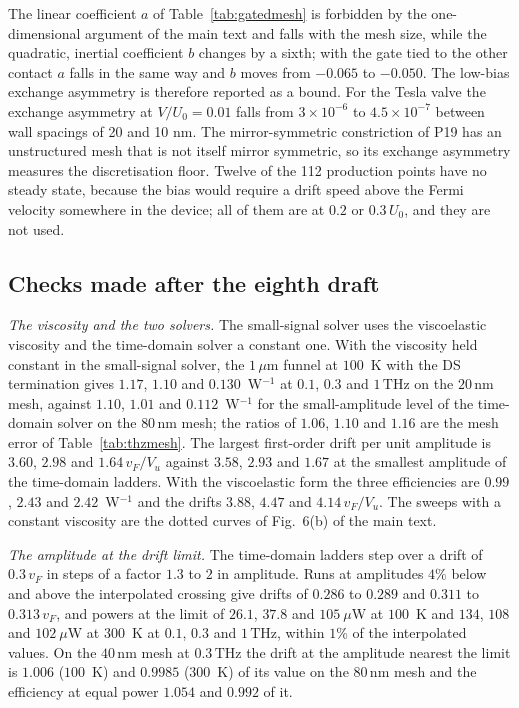\documentclass[aps,prapplied,onecolumn,superscriptaddress,floatfix]{revtex4-2}
\newcommand{\um}{\,\mu\mathrm{m}}
\newcommand{\nm}{\,\mathrm{nm}}
\newcommand{\THz}{\,\mathrm{THz}}
\begin{document}
The linear coefficient $a$ of Table~\ref{tab:gatedmesh} is forbidden by
the one-dimensional argument of the main text and falls with the mesh size,
while the quadratic, inertial coefficient $b$ changes by a sixth; with the
gate tied to the other contact $a$ falls in the same way and $b$ moves
from $-0.065$ to $-0.050$. The low-bias
exchange asymmetry is therefore reported as a bound. For the Tesla valve
the exchange asymmetry at $V/U_{0}=0.01$ falls from $3\times10^{-6}$ to
$4.5\times10^{-7}$ between wall spacings of 20 and 10 nm. The
mirror-symmetric constriction of P19 has an unstructured mesh that is not
itself mirror symmetric, so its exchange asymmetry measures the
discretisation floor. Twelve of the 112 production points have no steady
state, because the bias would require a drift speed above the Fermi
velocity somewhere in the device; all of them are at $0.2$ or $0.3\,U_{0}$,
and they are not used.

\subsection*{Checks made after the eighth draft}

\emph{The viscosity and the two solvers.} The small-signal solver uses
the viscoelastic viscosity and the time-domain solver a constant one.
With the viscosity held constant in the small-signal solver, the $1\um$
funnel at $100$~K with the DS termination gives $1.17$, $1.10$ and
$0.130$~W$^{-1}$ at $0.1$, $0.3$ and $1\THz$ on the $20\nm$ mesh, against
$1.10$, $1.01$ and $0.112$~W$^{-1}$ for the small-amplitude level of the
time-domain solver on the $80\nm$ mesh; the ratios of $1.06$, $1.10$ and
$1.16$ are the mesh error of Table~\ref{tab:thzmesh}. The largest
first-order drift per unit amplitude is $3.60$, $2.98$ and
$1.64\,v_{F}/V_{u}$ against $3.58$, $2.93$ and $1.67$ at the smallest
amplitude of the time-domain ladders. With the
viscoelastic form the three efficiencies are $0.99$, $2.43$ and
$2.42$~W$^{-1}$ and the drifts $3.88$, $4.47$ and $4.14\,v_{F}/V_{u}$. The
sweeps with a constant viscosity are the dotted curves of Fig.~6(b) of
the main text.

\emph{The amplitude at the drift limit.} The time-domain ladders step
over a drift of $0.3\,v_{F}$ in steps of a factor $1.3$ to $2$ in
amplitude. Runs at amplitudes $4\%$ below and above the interpolated
crossing give drifts of $0.286$ to $0.289$ and $0.311$ to
$0.313\,v_{F}$, and powers at the limit of $26.1$, $37.8$ and
$105\ \mu$W at $100$~K and $134$, $108$ and $102\ \mu$W at $300$~K at
$0.1$, $0.3$ and $1\THz$, within $1\%$ of the interpolated values. On
the $40\nm$ mesh at $0.3\THz$ the drift at the amplitude nearest the
limit is $1.006$ ($100$~K) and $0.9985$ ($300$~K) of its value on the
$80\nm$ mesh and the efficiency at equal power $1.054$ and $0.992$ of it.
\end{document}
